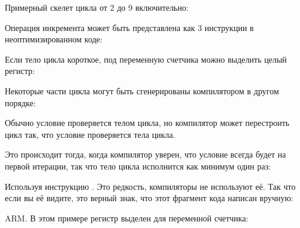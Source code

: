 ﻿\sectionold{\Conclusion{}}

Примерный скелет цикла от 2 до 9 включительно:



Операция инкремента может быть представлена как 3 инструкции в неоптимизированном коде:



Если тело цикла короткое, под переменную счетчика можно выделить целый регистр:



Некоторые части цикла могут быть сгенерированы компилятором в другом порядке:



Обычно условие проверяется  телом цикла, но компилятор может перестроить цикл так, 
что условие проверяется  тела цикла.

Это происходит тогда, когда компилятор уверен, что условие всегда будет  на первой итерации,
так что тело цикла исполнится как минимум один раз:



Используя инструкцию . Это редкость, компиляторы не используют её.
Так что если вы её видите, это верный знак, что этот фрагмент кода написан вручную:



ARM. 
В этом примере регистр  выделен для переменной счетчика:




